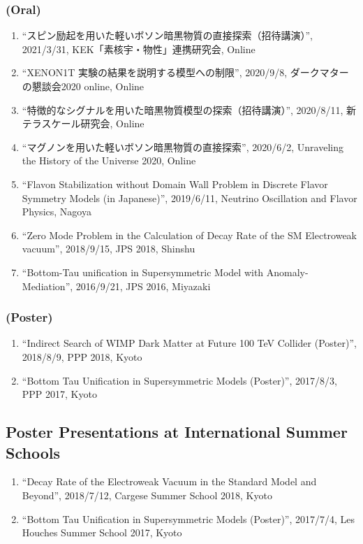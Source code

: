 \documentclass[12pt]{article}
\begin{document}
\subsubsection*{(Oral)}
\begin{enumerate}
 \item ``スピン励起を用いた軽いボソン暗黒物質の直接探索（招待講演）'', 2021/3/31, KEK「素核宇・物性」連携研究会, Online
 \item ``XENON1T 実験の結果を説明する模型への制限'', 2020/9/8, ダークマターの懇談会2020 online, Online
 \item ``特徴的なシグナルを用いた暗黒物質模型の探索（招待講演）'', 2020/8/11, 新テラスケール研究会, Online
 \item ``マグノンを用いた軽いボソン暗黒物質の直接探索'', 2020/6/2, Unraveling the History of the Universe 2020, Online
 \item ``Flavon Stabilization without Domain Wall Problem in Discrete Flavor Symmetry Models (in Japanese)'', 2019/6/11, Neutrino Oscillation and Flavor Physics, Nagoya
 \item ``Zero Mode Problem in the Calculation of Decay Rate of the SM Electroweak vacuum'', 2018/9/15, JPS 2018, Shinshu
 \item ``Bottom-Tau unification in Supersymmetric Model with Anomaly-Mediation'', 2016/9/21, JPS 2016, Miyazaki
\end{enumerate}
\subsubsection*{(Poster)}
\begin{enumerate}
 \item ``Indirect Search of WIMP Dark Matter at Future 100 TeV Collider (Poster)'', 2018/8/9, PPP 2018, Kyoto
 \item ``Bottom Tau Unification in Supersymmetric Models (Poster)'', 2017/8/3, PPP 2017, Kyoto
\end{enumerate}

\subsection*{Poster Presentations at International Summer Schools}
\begin{enumerate}
 \item ``Decay Rate of the Electroweak Vacuum in the Standard Model and Beyond'', 2018/7/12, Cargese Summer School 2018, Kyoto
 \item ``Bottom Tau Unification in Supersymmetric Models (Poster)'', 2017/7/4, Les Houches Summer School 2017, Kyoto
\end{enumerate}
\end{document}
